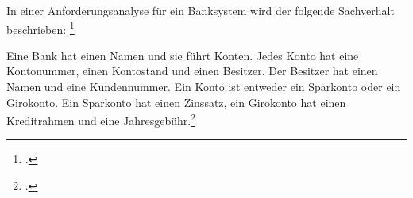 \documentclass{bschlangaul-aufgabe}
\begin{document}

\def\TmpHinweis#1{{\footnotesize[#1]}}

In einer Anforderungsanalyse für ein
Banksystem wird der folgende Sachverhalt beschrieben:
\footcite[(entnommen
aus Algorithmen und Datenstrukturen, 3. \& 4. Übungsblatt, Universität
Bayreuth), Aufgabe 1]{aud:pu:7}

Eine Bank hat einen Namen und sie führt Konten. Jedes Konto hat eine
Kontonummer, einen Kontostand und einen Besitzer. Der Besitzer hat einen
Namen und eine Kundennummer. Ein Konto ist entweder ein Sparkonto oder
ein Girokonto. Ein Sparkonto hat einen Zinssatz, ein Girokonto hat einen
Kreditrahmen und eine Jahresgebühr.\footcite[Thema 1 Aufgabe 4)]{examen:66112:2002:09}
\end{document}

